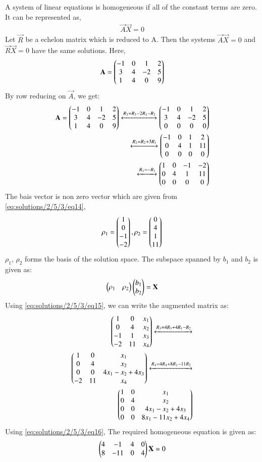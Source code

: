 A system of linear equations is homogeneous if all of the constant terms are zero. It can be represented as,
\begin{align}
\vec{A}\vec{X}=0
\end{align}
Let $\vec{R}$  be  a echelon matrix which is reduced to  A.  Then  the  systems  $\vec{A}\vec{X}  =  0$  and  $\vec{R}\vec{X}  =  0$  have  the  same solutions.
Here, 
\begin{align}
\mathbf{A}=\begin{pmatrix}-1&0&1&2\\3&4&-2&5\\1&4&0&9\end{pmatrix}
\end{align}
By row reducing on $\vec{A}$, we get:
\begin{align}
\mathbf{A}=\begin{pmatrix}-1&0&1&2\\3&4&-2&5\\1&4&0&9\end{pmatrix}
 \xleftrightarrow{R_3=R_3-2R_1-R_2}\begin{pmatrix}-1&0&1&2\\3&4&-2&5\\0&0&0&0\end{pmatrix}\\
  \xleftrightarrow{R_2=R_2+3R_1}\begin{pmatrix}-1&0&1&2\\0&4&1&11\\0&0&0&0\end{pmatrix}\\
  \xleftrightarrow{R_1=-R_1}\begin{pmatrix}1&0&-1&-2\\0&4&1&11\\0&0&0&0\end{pmatrix}\label{eq:solutions/2/5/3/eq14}
\end{align}
The bais vector is non zero vector which are given from \ref{eq:solutions/2/5/3/eq14},\\
\begin{align}
\rho_1=\begin{pmatrix}1\\0\\-1\\-2\end{pmatrix}, \rho_2=\begin{pmatrix}0\\4\\1\\11\end{pmatrix}
\end{align}
$\rho_1$, $\rho_2$ forms the basis of the solution space. The subspace spanned by $b_1$ and $b_2$ is given as:
\begin{align}
\begin{pmatrix}\rho_1 &\rho_2\end{pmatrix}\begin{pmatrix}b_1\\b_2\end{pmatrix}=\mathbf{X}\label{eq:solutions/2/5/3/eq15}
 \end{align}
 Using \ref{eq:solutions/2/5/3/eq15}, we can write the augmented matrix as:
 \begin{align}
\begin{pmatrix}1&0&x_1\\0&4&x_2\\-1&1&x_3\\-2&11&x_4\end{pmatrix}\xleftrightarrow{R_3=4R_3+4R_1-R_2}\\
\begin{pmatrix}1&0&x_1\\0&4&x_2\\0&0&4x_1-x_2+4x_3\\-2&11&x_4\end{pmatrix}\xleftrightarrow{R_4=4R_4+8R_1-11R_2}\\
\begin{pmatrix}1&0&x_1\\0&4&x_2\\0&0&4x_1-x_2+4x_3\\0&0&8x_1-11x_2+4x_4\end{pmatrix}\label{eq:solutions/2/5/3/eq16}
\end{align}
Using \ref{eq:solutions/2/5/3/eq16}, The required homogeneous equation is given as:
\begin{align}
\begin{pmatrix}4&-1&4&0\\8&-11&0&4\end{pmatrix}\mathbf{X}=0
\end{align}
